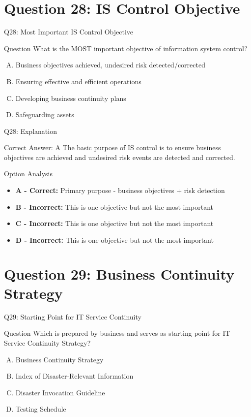 \documentclass{beamer}
\begin{document}
	\section{Question 28: IS Control Objective}
	
	\begin{frame}{Q28: Most Important IS Control Objective}
		\begin{block}{Question}
			What is the MOST important objective of information system control?
		\end{block}
		\begin{enumerate}[(A)]
			\item Business objectives achieved, undesired risk detected/corrected
			\item Ensuring effective and efficient operations
			\item Developing business continuity plans
			\item Safeguarding assets
		\end{enumerate}
	\end{frame}
	
	\begin{frame}{Q28: Explanation}
		\begin{block}{Correct Answer: A}
			The basic purpose of IS control is to ensure business objectives are achieved and undesired risk events are detected and corrected.
		\end{block}
		\begin{block}{Option Analysis}
			\begin{itemize}
				\item \textbf{A - Correct:} Primary purpose - business objectives + risk detection
				\item \textbf{B - Incorrect:} This is one objective but not the most important
				\item \textbf{C - Incorrect:} This is one objective but not the most important
				\item \textbf{D - Incorrect:} This is one objective but not the most important
			\end{itemize}
		\end{block}
	\end{frame}
	
	\section{Question 29: Business Continuity Strategy}
	
	\begin{frame}{Q29: Starting Point for IT Service Continuity}
		\begin{block}{Question}
			Which is prepared by business and serves as starting point for IT Service Continuity Strategy?
		\end{block}
		\begin{enumerate}[(A)]
			\item Business Continuity Strategy
			\item Index of Disaster-Relevant Information
			\item Disaster Invocation Guideline
			\item Testing Schedule
		\end{enumerate}
	\end{frame}
	
\end{document}
